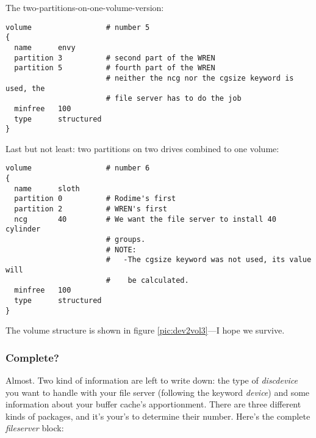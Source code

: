 The two-partitions-on-one-volume-version:

\begin{listing}
  \begin{verbatim}
volume                 # number 5
{
  name      envy
  partition 3          # second part of the WREN
  partition 5          # fourth part of the WREN
                       # neither the ncg nor the cgsize keyword is used, the
                       # file server has to do the job
  minfree   100
  type      structured 
}
  \end{verbatim}
\end{listing}

Last but not least: two partitions on two drives combined to one volume:

\begin{listing}
  \begin{verbatim}
volume                 # number 6
{
  name      sloth
  partition 0          # Rodime's first
  partition 2          # WREN's first
  ncg       40         # We want the file server to install 40 cylinder
                       # groups.
                       # NOTE:
                       #   -The cgsize keyword was not used, its value will
                       #    be calculated.
  minfree   100
  type      structured 
}
  \end{verbatim}
\end{listing}

The volume structure is shown in figure \ref{pic:dev2vol3}---I hope we
survive.



\subsubsection{Complete?}

Almost. Two kind of information are left to write down: the type of
{\it discdevice} you want to handle with your file server (following the
keyword {\it device}) and some information about
your buffer cache's apportionment. There are three different kinds of
packages, and it's your's to determine their number. Here's the complete
{\it fileserver} block:


